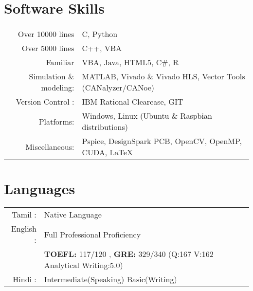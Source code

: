\documentclass[a4paper,10pt]{article} %
\begin{document}
\section{Software Skills}
\begin{tabular}{rl}
Over 10000 lines & C, Python\\
Over 5000 lines & C++, VBA\\
Familiar & VBA, Java, HTML5, C\#, R\\
Simulation \& modeling: & \textsc{MATLAB}, Vivado \& Vivado HLS, Vector Tools \textsc{(CAN}alyzer/\textsc{CAN}oe)\\
Version Control : &IBM Rational Clearcase, GIT\\
Platforms: & Windows, Linux (Ubuntu \& Raspbian distributions)\\
Miscellaneous: &Pspice, DesignSpark PCB, OpenCV, OpenMP, CUDA, LaTeX\\
\end{tabular}

%
\section{Languages}

\begin{tabular}{rl}
Tamil : & Native Language\\
English : & Full Professional Proficiency\\
& \textbf{TOEFL:} 117/120 , \textbf{GRE:} 329/340 (Q:167 V:162 Analytical Writing:5.0)\\
Hindi : & Intermediate(Speaking) Basic(Writing)
\end{tabular}
%
%
%
%
\end{document}
